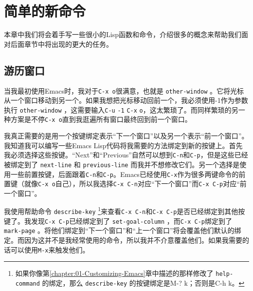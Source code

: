 \chapter{简单的新命令}
\label{chapter:02-Simple-New-Commands}


本章中我们将会着手写一些很小的Lisp函数和命令，介绍很多的概念来帮助我们面对后面章节中将出现的更大的任务。

\section{游历窗口}
\label{section:02-Traversing-Windows}

当我最初使用Emacs时，我对于\verb|C-x o|很满意，也就是 \texttt{other-window} 。它将光标从一个窗口移动到另一个。如果我想把光标移动回前一个，我必须使用-1作为参数执行 \texttt{other-window} ，这需要输入\verb|C-u| \verb|-1| \verb|C-x| \verb|o|，这太繁琐了。而同样繁琐的另一种方案是不停\verb|C-x o|直到我逛遍所有窗口最终回到前一个窗口。

我真正需要的是用一个按键绑定表示“下一个窗口”以及另一个表示“前一个窗口”。我知道我可以编写一些Emacs Lisp代码将我需要的方法绑定到新的按键上。首先我必须选择这些按键。“Next”和“Previous”自然可以想到\verb|C-n|和\verb|C-p|，但是这些已经被绑定到了 \texttt{next-line} 和 \texttt{previous-line} 而我并不想修改它们。另一个选择是使用一些前置按键，后面跟着\verb|C-n|和\verb|C-p|。Emacs已经使用\verb|C-x|作为很多两键命令的前置键（就像\verb|C-x o|自己），所以我选择\verb|C-x C-n|对应“下一个窗口”而\verb|C-x C-p|对应“前一个窗口”。

我使用帮助命令 \texttt{describe-key} \footnote{如果你像第\ref{chapter:01-Customizing-Emacs}章中描述的那样修改了 \texttt{help-command} 的绑定，那么 \texttt{describe-key} 的按键绑定是M-? k；否则是C-h k。}来查看\verb|C-x C-n|和\verb|C-x C-p|是否已经绑定到其他按键了。我发现\verb|C-x C-p|已经绑定到了 \texttt{set-goal-column} ，而\verb|C-x C-p|绑定到了 \texttt{mark-page} 。将他们绑定到“下一个窗口”和“上一个窗口”将会覆盖他们默认的绑定。而因为这并不是我经常使用的命令，所以我并不介意覆盖他们。如果我需要的话可以使用\verb|M-x|来触发他们。

